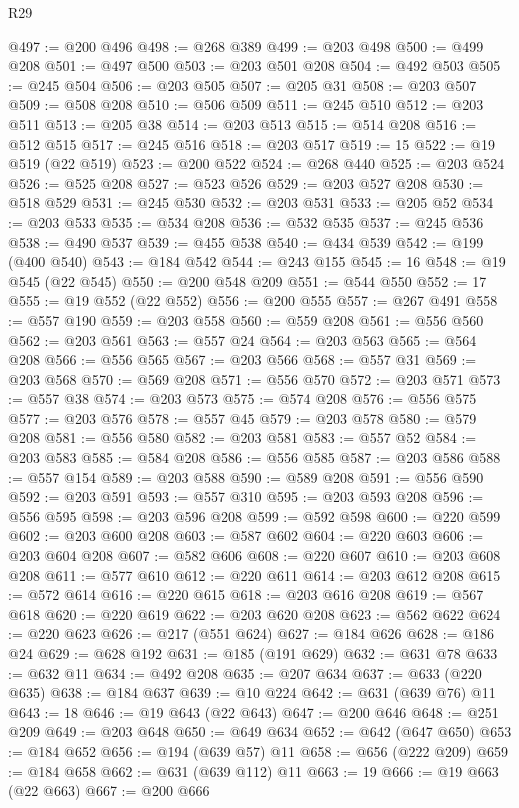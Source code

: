 \begin{lexlean}{R29}
\begin{coremodule}
@497 := @200 @496
@498 := @268 @389
@499 := @203 @498
@500 := @499 @208
@501 := @497 @500
@503 := @203 @501 @208
@504 := @492 @503
@505 := @245 @504
@506 := @203 @505
@507 := @205 @31
@508 := @203 @507
@509 := @508 @208
@510 := @506 @509
@511 := @245 @510
@512 := @203 @511
@513 := @205 @38
@514 := @203 @513
@515 := @514 @208
@516 := @512 @515
@517 := @245 @516
@518 := @203 @517
@519 := 15
@522 := @19 @519 (@22 @519)
@523 := @200 @522
@524 := @268 @440
@525 := @203 @524
@526 := @525 @208
@527 := @523 @526
@529 := @203 @527 @208
@530 := @518 @529
@531 := @245 @530
@532 := @203 @531
@533 := @205 @52
@534 := @203 @533
@535 := @534 @208
@536 := @532 @535
@537 := @245 @536
@538 := @490 @537
@539 := @455 @538
@540 := @434 @539
@542 := @199 (@400 @540)
@543 := @184 @542
@544 := @243 @155
@545 := 16
@548 := @19 @545 (@22 @545)
@550 := @200 @548 @209
@551 := @544 @550
@552 := 17
@555 := @19 @552 (@22 @552)
@556 := @200 @555
@557 := @267 @491
@558 := @557 @190
@559 := @203 @558
@560 := @559 @208
@561 := @556 @560
@562 := @203 @561
@563 := @557 @24
@564 := @203 @563
@565 := @564 @208
@566 := @556 @565
@567 := @203 @566
@568 := @557 @31
@569 := @203 @568
@570 := @569 @208
@571 := @556 @570
@572 := @203 @571
@573 := @557 @38
@574 := @203 @573
@575 := @574 @208
@576 := @556 @575
@577 := @203 @576
@578 := @557 @45
@579 := @203 @578
@580 := @579 @208
@581 := @556 @580
@582 := @203 @581
@583 := @557 @52
@584 := @203 @583
@585 := @584 @208
@586 := @556 @585
@587 := @203 @586
@588 := @557 @154
@589 := @203 @588
@590 := @589 @208
@591 := @556 @590
@592 := @203 @591
@593 := @557 @310
@595 := @203 @593 @208
@596 := @556 @595
@598 := @203 @596 @208
@599 := @592 @598
@600 := @220 @599
@602 := @203 @600 @208
@603 := @587 @602
@604 := @220 @603
@606 := @203 @604 @208
@607 := @582 @606
@608 := @220 @607
@610 := @203 @608 @208
@611 := @577 @610
@612 := @220 @611
@614 := @203 @612 @208
@615 := @572 @614
@616 := @220 @615
@618 := @203 @616 @208
@619 := @567 @618
@620 := @220 @619
@622 := @203 @620 @208
@623 := @562 @622
@624 := @220 @623
@626 := @217 (@551 @624)
@627 := @184 @626
@628 := @186 @24
@629 := @628 @192
@631 := @185 (@191 @629)
@632 := @631 @78
@633 := @632 @11
@634 := @492 @208
@635 := @207 @634
@637 := @633 (@220 @635)
@638 := @184 @637
@639 := @10 @224
@642 := @631 (@639 @76) @11
@643 := 18
@646 := @19 @643 (@22 @643)
@647 := @200 @646
@648 := @251 @209
@649 := @203 @648
@650 := @649 @634
@652 := @642 (@647 @650)
@653 := @184 @652
@656 := @194 (@639 @57) @11
@658 := @656 (@222 @209)
@659 := @184 @658
@662 := @631 (@639 @112) @11
@663 := 19
@666 := @19 @663 (@22 @663)
@667 := @200 @666

\end{coremodule}
\end{lexlean}
